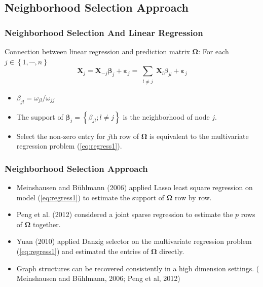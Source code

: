 \documentclass{beamer}
\newcommand{\bX}{\mathbf X}
\newcommand{\bbeta}{{\boldsymbol{\beta}}}
\newcommand{\bvarepsilon}{\boldsymbol{\varepsilon}}
\newcommand{\bOmega}{{\boldsymbol{\Omega}}}
\begin{document}
\subsection{Neighborhood Selection Approach}
\begin{frame}
	\frametitle{Neighborhood Selection And Linear Regression}
	\pause
	Connection between linear regression and prediction matrix $\bOmega$: For each $j \in \left\{1 , \cdots, n\right\}$
	\begin{equation}
	\label{eq:regress1}
	\bX_j = \bX_{-j} \bbeta_j + \bvarepsilon_j = \sum_{\substack{l \neq j}} \bX_l \beta_{jl} + \bvarepsilon_j
	\end{equation}
	\begin{itemize}[<+->]
		\item $\beta_{jl} = \omega_{jl}/\omega_{jj}$
		\item The support of $\bbeta_j = \left\{\beta_{jl}; l \neq j \right\}$ is the neighborhood of node $j$. 
		\item Select the non-zero entry for $j$th row of $\bOmega$ is equivalent to the multivariate regression problem (\ref{eq:regress1}).     
	\end{itemize}
	
\end{frame}


\begin{frame}
	\frametitle{Neighborhood Selection Approach}
	
	\begin{itemize}[<+->]
		\item Meinshausen and B{\"u}hlmann (2006) applied Lasso least square regression on model (\ref{eq:regress1}) to estimate the support of $\bOmega$ row by row.
		\item Peng et al. (2012) considered a joint sparse regression to estimate the $p$ rows of $\bOmega$ together.
		\item Yuan (2010) applied Danzig selector on the multivariate regression problem (\ref{eq:regress1}) and estimated the entries of $\bOmega$ directly.   
		\item Graph structures can be recovered consistently in a high dimension settings. ( Meinshausen and B{\"u}hlmann, 2006; Peng et al, 2012) 
	\end{itemize}
	
\end{frame}
\end{document}
